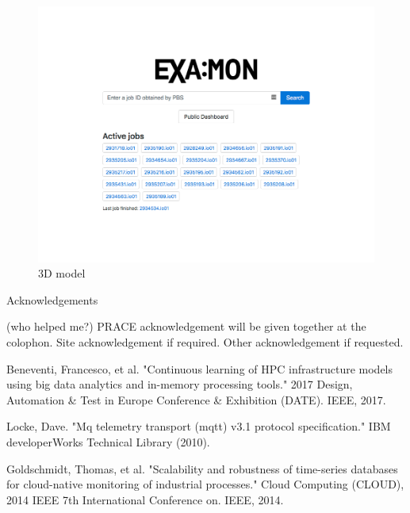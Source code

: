 \documentclass[a4paper, twoside]{article}
\newcommand{\highlight}[1]{\textcolor{prace-orange}{#1}}
\newcommand{\itempar}[1]{\noindent\highlight{\textsf #1}\par\noindent}
\begin{document}
\begin{multicols}{3}
\begin{figure}[t!]
\begin{minipage}[b]{\columnwidth}
        \includegraphics[width=\linewidth]{job-lookup}
    \end{minipage}
    \caption*{3D model}
    \label{fig:3d}
\end{figure}

\itempar{Acknowledgements} (who helped me?) PRACE acknowledgement will be given together at the colophon. Site acknowledgement if required. Other acknowledgement if requested.

\newcommand{\sohpcinfo}[1]{\par\vspace{1ex}\footnotesize
  \textcolor{prace-lightblue}{PRACE SoHPC }%
  \textcolor{prace-darkblue}{#1}\\[0.5ex]\scriptsize
}

\renewcommand\refname{\usefont{OT1}{phv}{m}{n}\selectfont\small{References}}
\begin{thebibliography}{9}
\vspace*{-1ex}  %
\scriptsize
{}
Beneventi, Francesco, et al. "Continuous learning of HPC infrastructure models using big data analytics and in-memory processing tools." 2017 Design, Automation \& Test in Europe Conference \& Exhibition (DATE). IEEE, 2017.

Locke, Dave. "Mq telemetry transport (mqtt) v3.1 protocol specification." IBM developerWorks Technical Library (2010).

Goldschmidt, Thomas, et al. "Scalability and robustness of time-series databases for cloud-native monitoring of industrial processes." Cloud Computing (CLOUD), 2014 IEEE 7th International Conference on. IEEE, 2014.


\end{thebibliography}
\end{multicols}
\end{document}
